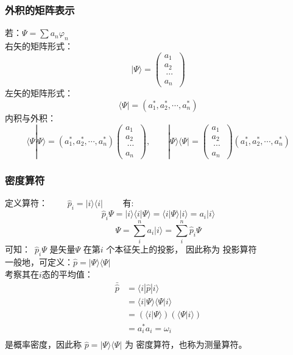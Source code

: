 \begin{frame}
    \frametitle{外积的矩阵表示}
    若：$ \Psi =\sum a_n \varphi_n $\\
    右矢的矩阵形式：
    $$|\Psi\rangle = \begin{pmatrix}
        a_1\\
        a_2\\\
        \cdots\\
        a_n\
    \end{pmatrix}$$ 
    左矢的矩阵形式：
    $$ \langle\Psi| = (a_1 ^*, a_2 ^*, \cdots, a_n ^*) $$
    内积与外积：
    $$\langle\Psi|\Psi\rangle= (a_1 ^*, a_2 ^*, \cdots, a_n ^*) \begin{pmatrix}
        a_1\\
        a_2\\\
        \cdots\\
        a_n\
    \end{pmatrix},\qquad  |\Psi\rangle\langle\Psi|= \begin{pmatrix}
        a_1\\
        a_2\\\
        \cdots\\
        a_n\
    \end{pmatrix} (a_1 ^*, a_2 ^*, \cdots, a_n ^*) $$
\end{frame} 

\begin{frame}
    \frametitle{密度算符}
    定义算符： $ \qquad  \hat{p}_i = |i\rangle\langle i | \qquad $ 有: 
    $$ \hat{p}_i\Psi= |i\rangle\langle i | \Psi \rangle = \langle i | \Psi \rangle |i\rangle=a_i |i\rangle $$
    $$\Psi= \sum\limits_i ^n a_i |i\rangle = \sum\limits_i ^n \hat{p}_i\Psi$$
    可知： $ \hat{p}_i\Psi $ 是矢量$\Psi$ 在第$i$ 个本征矢上的投影， 因此称为{\color{red} 投影算符}\\
    一般地，可定义：$\hat{p} = |\Psi\rangle\langle \Psi |$\\
    考察其在$i$态的平均值：
    $$ \begin{aligned}
    \bar{\hat{p}} &=\langle i |\hat{p} | i \rangle \\
               &=\langle i |\Psi\rangle\langle \Psi | i \rangle \\
               &=(\langle i |\Psi\rangle) (\langle \Psi | i \rangle) \\
               &=a_i ^* a_i =\omega_i \\
    \end{aligned} $$
    是概率密度，因此称 $\hat{p} = |\Psi\rangle\langle \Psi |$ 为 {\color{red} 密度算符}，也称为测量算符。
\end{frame} 
 
